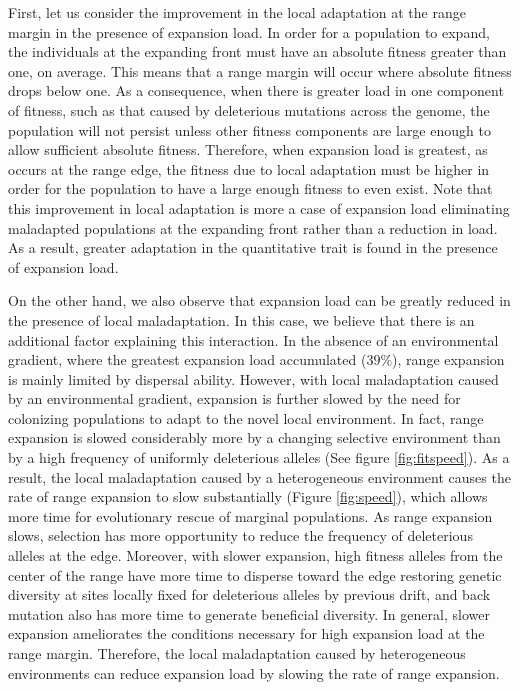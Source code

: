 First, let us consider the improvement in the local adaptation at the range margin in the presence of expansion load. In order for a population to expand, the individuals at the expanding front must have an absolute fitness greater than one, on average. This means that a range margin will occur where absolute fitness drops below one. As a consequence, when there is greater load in one component of fitness, such as that caused by deleterious mutations across the genome, the population will not persist unless other fitness components are large enough to allow sufficient absolute fitness. Therefore, when expansion load is greatest, as occurs at the range edge, the fitness due to local adaptation must be higher in order for the population to have a large enough fitness to even exist. Note that this improvement in local adaptation is more a case of expansion load eliminating maladapted populations at the expanding front rather than a reduction in load. As a result, greater adaptation in the quantitative trait is found in the presence of expansion load.

On the other hand, we also observe that expansion load can be greatly reduced in the presence of local maladaptation. In this case, we believe that there is an additional factor explaining this interaction.  In the absence of an environmental gradient, where the greatest expansion load accumulated ($39\%$), range expansion is mainly limited by dispersal ability. However, with local maladaptation caused by an environmental gradient, expansion is further slowed by the need for colonizing populations to adapt to the novel local environment. In fact, range expansion is slowed considerably more by a changing selective environment than by a high frequency of uniformly deleterious alleles (See figure \ref{fig:fitspeed}). As a result, the local maladaptation caused by a heterogeneous environment causes the rate of range expansion to slow substantially (Figure \ref{fig:speed}), which allows more time for evolutionary rescue of marginal populations. As range expansion slows, selection has more opportunity to reduce the frequency of deleterious alleles at the edge. Moreover, with slower expansion, high fitness alleles from the center of the range have more time to disperse toward the edge restoring genetic diversity at sites locally fixed for deleterious alleles by previous drift, and back mutation also has more time to generate beneficial diversity. In general, slower expansion ameliorates the conditions necessary for high expansion load at the range margin. Therefore, the local maladaptation caused by heterogeneous environments can reduce expansion load by slowing the rate of range expansion.

